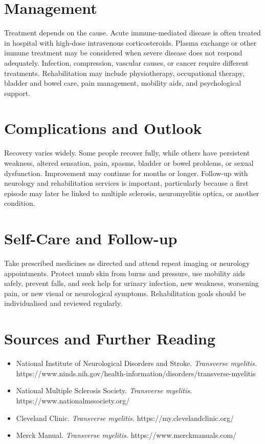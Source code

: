 \section*{Management}
Treatment depends on the cause. Acute immune-mediated disease is often treated in hospital with high-dose intravenous corticosteroids. Plasma exchange or other immune treatment may be considered when severe disease does not respond adequately. Infection, compression, vascular causes, or cancer require different treatments. Rehabilitation may include physiotherapy, occupational therapy, bladder and bowel care, pain management, mobility aids, and psychological support.

\section*{Complications and Outlook}
Recovery varies widely. Some people recover fully, while others have persistent weakness, altered sensation, pain, spasms, bladder or bowel problems, or sexual dysfunction. Improvement may continue for months or longer. Follow-up with neurology and rehabilitation services is important, particularly because a first episode may later be linked to multiple sclerosis, neuromyelitis optica, or another condition.

\section*{Self-Care and Follow-up}
Take prescribed medicines as directed and attend repeat imaging or neurology appointments. Protect numb skin from burns and pressure, use mobility aids safely, prevent falls, and seek help for urinary infection, new weakness, worsening pain, or new visual or neurological symptoms. Rehabilitation goals should be individualised and reviewed regularly.

\section*{Sources and Further Reading}
\begin{itemize}
    \item National Institute of Neurological Disorders and Stroke. \textit{Transverse myelitis.} https://www.ninds.nih.gov/health-information/disorders/transverse-myelitis
    \item National Multiple Sclerosis Society. \textit{Transverse myelitis.} https://www.nationalmssociety.org/
    \item Cleveland Clinic. \textit{Transverse myelitis.} https://my.clevelandclinic.org/
    \item Merck Manual. \textit{Transverse myelitis.} https://www.merckmanuals.com/
\end{itemize}

